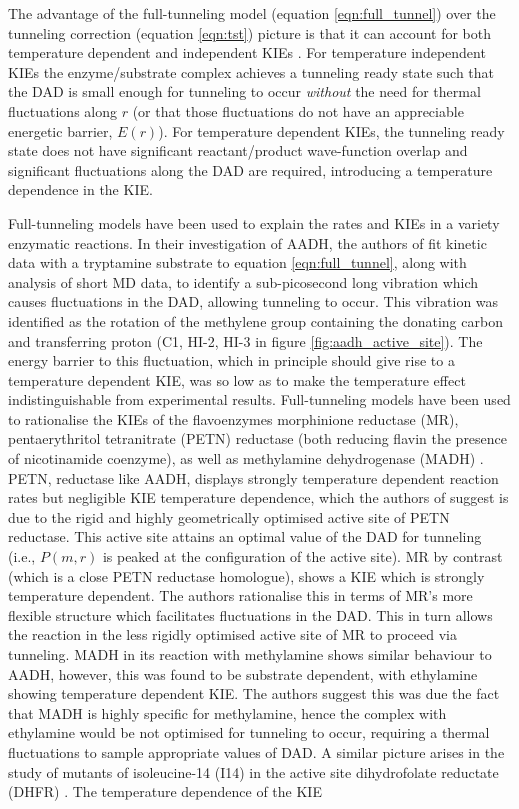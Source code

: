 The advantage of the full-tunneling model (equation \ref{eqn:full_tunnel}) over the tunneling correction (equation \ref{eqn:tst}) picture is that it can account for both temperature dependent and independent KIEs \cite{klinmanbeyond2009, klinmanHydrogenTunnelingLinks2013}. For temperature independent KIEs the enzyme/substrate complex achieves a tunneling ready state such that the DAD is small enough for tunneling to occur \emph{without} the need for thermal fluctuations along $r$ (or that those fluctuations do not have an appreciable energetic  barrier, $E(r)$).  For temperature dependent KIEs, the tunneling ready state does not have significant reactant/product wave-function overlap and significant fluctuations along the DAD are required, introducing a temperature dependence in the KIE.  

Full-tunneling models have been used to explain the rates and KIEs in a variety enzymatic reactions.  In their investigation of AADH, the authors of \cite{johannissenProtonTunnelingAromatic2007, johannissenEnzymeAromaticAmine2008} fit kinetic data with a tryptamine substrate to equation \ref{eqn:full_tunnel}, along with analysis of short MD data, to identify a sub-picosecond long vibration which causes fluctuations in the DAD, allowing tunneling to occur. This vibration was identified as the rotation of the methylene group containing the donating carbon and transferring proton (C1, HI-2, HI-3 in figure \ref{fig:aadh_active_site}). The energy barrier to this fluctuation, which in principle should give rise to a temperature dependent KIE, was so low as to make the temperature effect indistinguishable from experimental results. Full-tunneling models have been used to rationalise the KIEs of the  flavoenzymes morphinione reductase (MR), pentaerythritol tetranitrate (PETN) reductase (both reducing flavin the presence of nicotinamide coenzyme), as well as methylamine dehydrogenase (MADH) \cite{sutcliffeHydrogenTunnellingEnzymecatalysed2006}.  PETN, reductase like AADH, displays strongly temperature dependent reaction rates but negligible KIE temperature dependence, which the authors of suggest is due to the rigid and highly geometrically optimised active site of PETN reductase. This active site attains an optimal value of the DAD for tunneling (i.e., $P(m, r)$ is peaked at the configuration of the active site). MR by contrast (which is a close PETN reductase homologue), shows a KIE which is strongly temperature dependent.  The authors rationalise this in terms of MR's more flexible structure which facilitates fluctuations in the DAD. This in turn allows the reaction in the less rigidly optimised active site of MR to proceed via tunneling. MADH in its reaction with methylamine shows similar behaviour to AADH, however, this was found to be substrate dependent, with ethylamine showing temperature dependent KIE.  The authors suggest this was due the fact that MADH is highly specific for methylamine, hence the complex with ethylamine would be not optimised for tunneling to occur, requiring a thermal fluctuations  to sample appropriate values of DAD. A similar picture arises in the study of mutants of isoleucine-14 (I14) in the active site dihydrofolate reductate (DHFR) \cite{stojkovic2012effects}. The temperature dependence of the KIE 